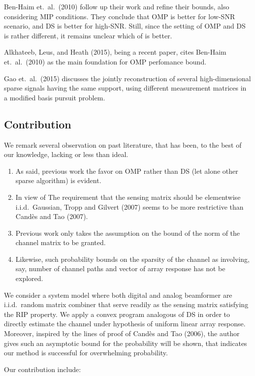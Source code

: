 \documentclass[12pt]{article}
\begin{document}
Ben-Haim et.\ al.\ (2010) follow up their work and refine their bounds, also considering MIP conditions.
They conclude that OMP is better for low-SNR scenario, and DS is better for high-SNR.
Still, since the setting of OMP and DS is rather different, it remains unclear which of is better.

Alkhateeb, Leus, and Heath (2015), being a recent paper, cites Ben-Haim et.\ al.\ (2010) as the main foundation for OMP perfomance bound.

Gao et.\ al.\ (2015) discusses the jointly reconstruction of several high-dimensional sparse signals having the same support, using different measurement matrices in a modified basis pursuit problem.

\subsection{Contribution}

We remark several observation on past literature, that has been, to the best of our knowledge, lacking or less than ideal.

\begin{enumerate}
\item As said, previous work the favor on OMP rather than DS (let alone other sparse algorithm) is evident.
\item In view of The requirement that the sensing matrix should be elementwise i.i.d.\ Gaussian, Tropp and Gilvert (2007) seems to be more restrictive than Cand\`es and Tao (2007).
\item Previous work only takes the assumption on the bound of the norm of the channel matrix to be granted.
\item Likewise, such probability bounds on the sparsity of the channel as involving, say, number of channel paths and vector of array response has not be explored.
\end{enumerate}

We consider a system model where both digital and analog beamformer are i.i.d.\ random matrix combiner that serve readily as the sensing matrix satisfying the RIP property.
We apply a convex program analogous of DS in order to directly estimate the channel under hypothesis of uniform linear array response.
Moreover, inspired by the lines of proof of Cand\`es and Tao (2006), the author gives such an asymptotic bound for the probability will be shown, that indicates our method is successful for overwhelming probability.

Our contribution include:
\end{document}
